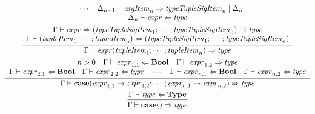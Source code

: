 \begin{gather*}
{\begin{array}{c}
      \hspace{1em}
      \cdots
      \hspace{1em}
      \Delta_{n - 1} \vdash \mathit{argItem}_n \Rightarrow \mathit{typeTupleSigItem}_n \mid \Delta_n
      \\
      \Delta_n \vdash \mathit{expr} \Leftarrow \mathit{type}
    \end{array}
  }
  \\
  \infer{\Gamma \vdash \mathit{expr}(\mathit{tupleItem}_1; \cdots; \mathit{tupleItem}_n) \Rightarrow \mathit{type}}{
    \begin{array}{c}
      \Gamma \vdash \mathit{expr} \Rightarrow (\mathit{typeTupleSigItem}_1; \cdots; \mathit{typeTupleSigItem}_n) \rightarrow \mathit{type}
      \\
      \Gamma \vdash (\mathit{tupleItem}_1; \cdots; \mathit{tupleItem}_n) \Leftarrow (\mathit{typeTupleSigItem}_1; \cdots; \mathit{typeTupleSigItem}_n)
    \end{array}
  }
  \\
  \infer{\Gamma \vdash \mathbf{case}(\mathit{expr}_{1,1} \rightarrow \mathit{expr}_{1,2}; \cdots; \mathit{expr}_{n,1} \rightarrow \mathit{expr}_{n,2}) \Rightarrow \mathit{type}}{
    \begin{array}{c}
      n > 0
      \hspace{1em}
      \Gamma \vdash \mathit{expr}_{1, 1} \Leftarrow \mathbf{Bool}
      \hspace{1em}
      \Gamma \vdash \mathit{expr}_{1, 2} \Rightarrow \mathit{type}
      \\
      \Gamma \vdash \mathit{expr}_{2, 1} \Leftarrow \mathbf{Bool}
      \hspace{1em}
      \Gamma \vdash \mathit{expr}_{2, 2} \Leftarrow \mathit{type}
      \hspace{1em}
      \cdots
      \hspace{1em}
      \Gamma \vdash \mathit{expr}_{n, 1} \Leftarrow \mathbf{Bool}
      \hspace{1em}
      \Gamma \vdash \mathit{expr}_{n, 2} \Leftarrow \mathit{type}
    \end{array}
  }
  \\
  \infer{\Gamma \vdash \mathbf{case}() \Rightarrow \mathit{type}}{
    \Gamma \vdash \mathit{type} \Leftarrow \mathbf{Type}
  }
\end{gather*}
